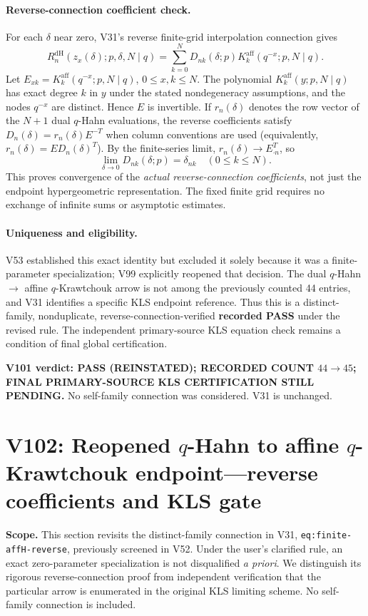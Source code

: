 \documentclass[11pt]{article}
\begin{document}
\paragraph{Reverse-connection coefficient check.} For each $\delta$ near zero, V31's reverse finite-grid interpolation connection gives
\[
 R_n^{\mathrm{dH}}(z_x(\delta);p,\delta,N\mid q)
 =\sum_{k=0}^{N}D_{nk}(\delta;p)K_k^{\mathrm{aff}}(q^{-x};p,N\mid q).
\]
Let $E_{xk}=K_k^{\mathrm{aff}}(q^{-x};p,N\mid q)$, $0\le x,k\le N$. The polynomial $K_k^{\mathrm{aff}}(y;p,N\mid q)$ has exact degree $k$ in $y$ under the stated nondegeneracy assumptions, and the nodes $q^{-x}$ are distinct. Hence $E$ is invertible. If $r_n(\delta)$ denotes the row vector of the $N+1$ dual $q$-Hahn evaluations, the reverse coefficients satisfy $D_n(\delta)=r_n(\delta)E^{-T}$ when column conventions are used (equivalently, $r_n(\delta)=E D_n(\delta)^T$). By the finite-series limit, $r_n(\delta)\to E_{\cdot n}^T$, so
\[
 \boxed{\lim_{\delta\to0}D_{nk}(\delta;p)=\delta_{nk}\quad(0\le k\le N).}
\]
This proves convergence of the \emph{actual reverse-connection coefficients}, not just the endpoint hypergeometric representation. The fixed finite grid requires no exchange of infinite sums or asymptotic estimates.

\paragraph{Uniqueness and eligibility.} V53 established this exact identity but excluded it solely because it was a finite-parameter specialization; V99 explicitly reopened that decision. The dual $q$-Hahn $\to$ affine $q$-Krawtchouk arrow is not among the previously counted 44 entries, and V31 identifies a specific KLS endpoint reference. Thus this is a distinct-family, nonduplicate, reverse-connection-verified \textbf{recorded PASS} under the revised rule. The independent primary-source KLS equation check remains a condition of final global certification.

\noindent\textbf{V101 verdict: PASS (REINSTATED); RECORDED COUNT $44\to45$; FINAL PRIMARY-SOURCE KLS CERTIFICATION STILL PENDING.} No self-family connection was considered. V31 is unchanged.



\section{V102: Reopened $q$-Hahn to affine $q$-Krawtchouk endpoint---reverse coefficients and KLS gate}
\noindent\textbf{Scope.} This section revisits the distinct-family connection in V31, \texttt{eq:finite-affH-reverse}, previously screened in V52. Under the user's clarified rule, an exact zero-parameter specialization is not disqualified \emph{a priori}. We distinguish its rigorous reverse-connection proof from independent verification that the particular arrow is enumerated in the original KLS limiting scheme. No self-family connection is included.
\end{document}
